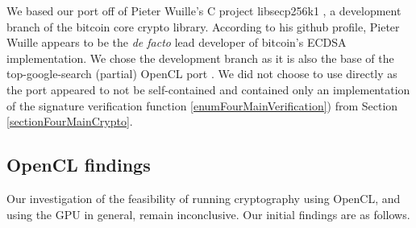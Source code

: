 \documentclass{article}
\begin{document}
We based our port off of Pieter Wuille's C project libsecp256k1 \cite{Wuille:secp256k1}, a development branch of the bitcoin core crypto library. According to his github profile, Pieter Wuille appears to be the \emph{de facto} lead developer of bitcoin's ECDSA implementation. We chose the development branch as it is also the base of the top-google-search (partial) OpenCL port \cite{secp256k1:openCLimplementationHanh0}. We did not choose to use \cite{secp256k1:openCLimplementationHanh0} directly as the port appeared to not be self-contained and contained only an implementation of the signature verification function \ref{enumFourMainVerification})  from Section \ref{sectionFourMainCrypto}.


\subsection{OpenCL findings}
Our investigation of the feasibility of running cryptography using OpenCL, and using the GPU in general, remain inconclusive. Our initial findings are as follows. 
\end{document}
